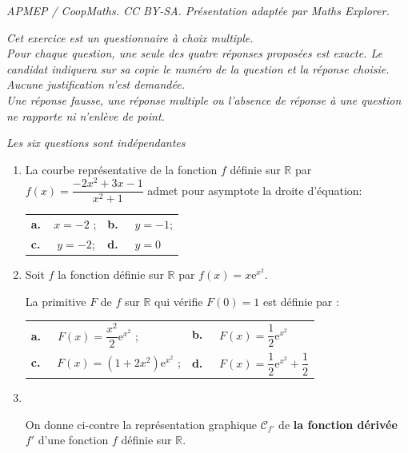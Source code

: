 \documentclass[10pt]{article}
\providecommand{\R}{\mathbb{R}}
\begin{document}
\noindent\textit{APMEP / CoopMaths. CC BY-SA. Présentation adaptée par Maths Explorer.}\par\medskip
\medskip

\emph{Cet exercice est un questionnaire à choix multiple.\\
Pour chaque question, une seule des quatre réponses proposées est exacte. Le candidat indiquera sur sa copie le numéro de la question et la réponse choisie. \\
Aucune justification n'est demandée.\\
Une réponse fausse, une réponse multiple ou l'absence de réponse à une question ne rapporte ni n'enlève de point.}

\emph{Les six questions sont indépendantes}

\medskip

\begin{enumerate}
\item La courbe représentative de la fonction $f$ définie sur $\R$ par $f(x) = \dfrac{-2x^2 + 3x - 1}{x^2 + 1}$ admet pour asymptote
la droite d'équation:

\begin{center}
\begin{tabularx}{\linewidth}{*{2}{X}}
\textbf{a.~~}$x = -2$ ; &\textbf{b.~~} $y = -1$;\\
\textbf{c.~~} $y = - 2$;&\textbf{d.~~} $y = 0$
\end{tabularx}
\end{center}
\item Soit $f$ la fonction définie sur $\R$ par $f(x) = x\text{e}^{x^2}$.

La primitive $F$ de $f$ sur $\R$ qui vérifie $F(0) = 1$ est définie par :

\begin{center}
\renewcommand\arraystretch{1.9}
\begin{tabularx}{\linewidth}{*{2}{X}}
\textbf{a.~~} $F(x) = \dfrac{x^2}{2}\text{e}^{x^2}$ ;&\textbf{b.~~} $F(x) = \dfrac{1}{2}\text{e}^{x^2}$\\
\textbf{c.~~} $F(x) = \left(1 + 2x^2\right)\text{e}^{x^2}$ ;&\textbf{d.~~} $F(x) = \dfrac{1}{2}\text{e}^{x^2} + \dfrac{1}{2}$
\end{tabularx}
\renewcommand\arraystretch{1}
\end{center}

\item ~

\begin{minipage}{0.4\linewidth}
On donne ci-contre la représentation graphique $\mathcal{C}_{f'}$ de \textbf{la fonction dérivée }\boldmath $f'$\unboldmath{}  d'une fonction $f$ définie sur $\R$.


\end{minipage}
\end{enumerate}
\end{document}
